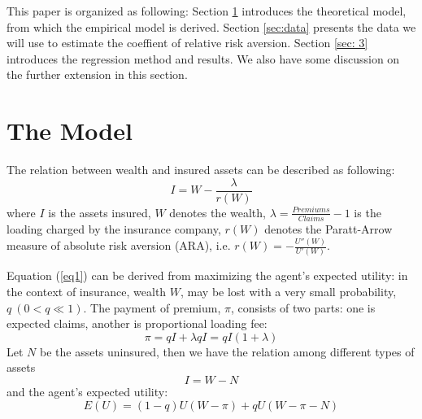 \documentclass[11pt, a4paper, leqno]{article}
\begin{document}
This paper is organized as following: Section \ref{sec:model} introduces the theoretical model, from which the empirical model is derived. Section \ref{sec:data} presents the data we will use to estimate the coeffient of relative risk aversion. Section \ref{sec: 3} introduces the regression method and results. We also have some discussion on the further extension in this section.

\section{The Model}\label{sec:model}

The relation between wealth and insured assets can be described as following:
\begin{equation}\label{eq1}
I = W - \frac{\lambda}{r(W)}
\end{equation}
where $I$ is the assets insured, $W$ denotes the wealth, $\lambda = \frac{Premiums}{Claims} - 1$ is the loading charged by the insurance company, $r(W)$ denotes the Paratt-Arrow measure of absolute risk aversion (ARA), i.e. $r(W) = -\frac{U''(W)}{U'(W)}$.

Equation (\ref{eq1}) can be derived from maximizing the agent's expected utility: in the context of insurance, wealth $W$, may be lost with a very small probability, $q\ (0<q\ll1)$. The payment of premium, $\pi$, consists of two parts: one is expected claims, another is proportional loading fee:
\begin{equation}
\pi = qI + \lambda qI =qI(1 + \lambda)
\end{equation}
Let $N$ be the assets uninsured, then we have the relation among different types of assets
\begin{equation}\label{eq3}
I = W - N
\end{equation}
and the agent's expected utility:
\begin{equation}
E(U) = (1-q)U(W-\pi)+qU(W-\pi-N)
\end{equation}
\end{document}

